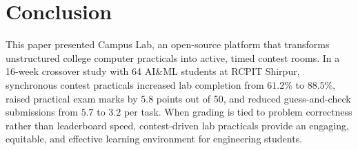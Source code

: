 \documentclass[12pt,a4paper]{article}
\begin{document}
\section*{Conclusion}
This paper presented Campus Lab, an open-source platform that transforms unstructured college computer practicals into active, timed contest rooms. In a 16-week crossover study with 64 AI\&ML students at RCPIT Shirpur, synchronous contest practicals increased lab completion from $61.2\%$ to $88.5\%$, raised practical exam marks by $5.8$ points out of 50, and reduced guess-and-check submissions from $5.7$ to $3.2$ per task. When grading is tied to problem correctness rather than leaderboard speed, contest-driven lab practicals provide an engaging, equitable, and effective learning environment for engineering students.

\end{document}
